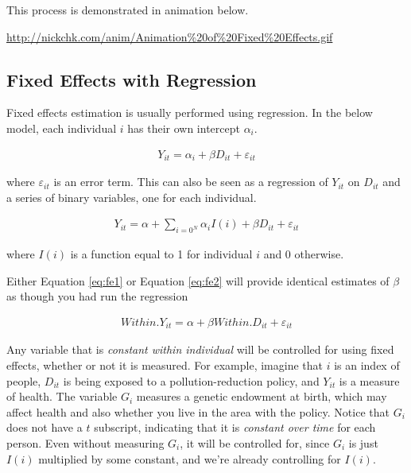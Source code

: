 \documentclass[]{book}
\theoremstyle{definition}
\theoremstyle{definition}
\theoremstyle{definition}
\theoremstyle{remark}
\begin{document}
This process is demonstrated in animation below.

\url{http://nickchk.com/anim/Animation%20of%20Fixed%20Effects.gif}

\subsection{Fixed Effects with
Regression}\label{fixed-effects-with-regression}

Fixed effects estimation is usually performed using regression. In the
below model, each individual \(i\) has their own intercept
\(\alpha_{i}\).

\begin{align}
  Y_{it} = \alpha_i + \beta D_{it} + \varepsilon_{it} \label{eq:fe1}
\end{align}

where \(\varepsilon_{it}\) is an error term. This can also be seen as a
regression of \(Y_{it}\) on \(D_{it}\) and a series of binary variables,
one for each individual.

\begin{align}
  Y_{it} = \alpha + \sum_{i=0^N}\alpha_iI(i) + \beta D_{it} + \varepsilon_{it} \label{eq:fe2}
\end{align}

where \(I(i)\) is a function equal to 1 for individual \(i\) and 0
otherwise.

Either Equation \eqref{eq:fe1} or Equation \eqref{eq:fe2} will provide
identical estimates of \(\beta\) as though you had run the regression

\begin{align}
  Within.Y_{it} = \alpha + \beta Within.D_{it} + \varepsilon_{it} \label{eq:fe3}
\end{align}

Any variable that is \emph{constant within individual} will be
controlled for using fixed effects, whether or not it is measured. For
example, imagine that \(i\) is an index of people, \(D_{it}\) is being
exposed to a pollution-reduction policy, and \(Y_{it}\) is a measure of
health. The variable \(G_i\) measures a genetic endowment at birth,
which may affect health and also whether you live in the area with the
policy. Notice that \(G_i\) does not have a \(t\) subscript, indicating
that it is \emph{constant over time} for each person. Even without
measuring \(G_i\), it will be controlled for, since \(G_i\) is just
\(I(i)\) multiplied by some constant, and we're already controlling for
\(I(i)\).
\end{document}

